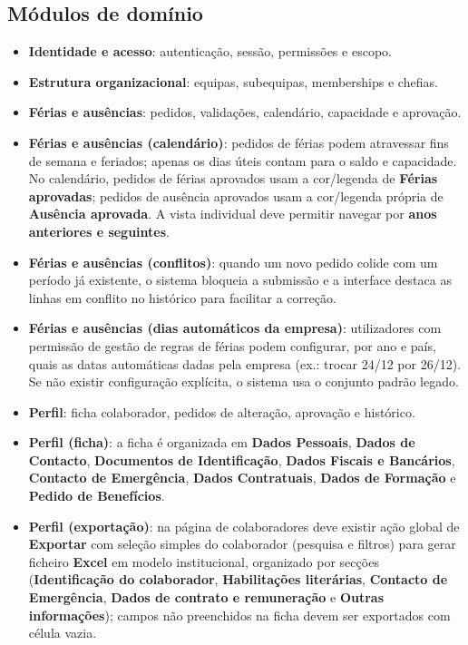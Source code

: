 \documentclass[11pt,a4paper]{article}
\begin{document}
\subsection{Módulos de domínio}
\begin{itemize}
  \item \textbf{Identidade e acesso}: autenticação, sessão, permissões e escopo.
  \item \textbf{Estrutura organizacional}: equipas, subequipas, memberships e chefias.
  \item \textbf{Férias e ausências}: pedidos, validações, calendário, capacidade e aprovação.
  \item \textbf{Férias e ausências (calendário)}: pedidos de férias podem atravessar fins de semana e feriados; apenas os dias úteis contam para o saldo e capacidade. No calendário, pedidos de férias aprovados usam a cor/legenda de \textbf{Férias aprovadas}; pedidos de ausência aprovados usam a cor/legenda própria de \textbf{Ausência aprovada}. A vista individual deve permitir navegar por \textbf{anos anteriores e seguintes}.
  \item \textbf{Férias e ausências (conflitos)}: quando um novo pedido colide com um período já existente, o sistema bloqueia a submissão e a interface destaca as linhas em conflito no histórico para facilitar a correção.
  \item \textbf{Férias e ausências (dias automáticos da empresa)}: utilizadores com permissão de gestão de regras de férias podem configurar, por ano e país, quais as datas automáticas dadas pela empresa (ex.: trocar 24/12 por 26/12). Se não existir configuração explícita, o sistema usa o conjunto padrão legado.
  \item \textbf{Perfil}: ficha colaborador, pedidos de alteração, aprovação e histórico.
  \item \textbf{Perfil (ficha)}: a ficha é organizada em \textbf{Dados Pessoais}, \textbf{Dados de Contacto}, \textbf{Documentos de Identificação}, \textbf{Dados Fiscais e Bancários}, \textbf{Contacto de Emergência}, \textbf{Dados Contratuais}, \textbf{Dados de Formação} e \textbf{Pedido de Benefícios}.
  \item \textbf{Perfil (exportação)}: na página de colaboradores deve existir ação global de \textbf{Exportar} com seleção simples do colaborador (pesquisa e filtros) para gerar ficheiro \textbf{Excel} em modelo institucional, organizado por secções (\textbf{Identificação do colaborador}, \textbf{Habilitações literárias}, \textbf{Contacto de Emergência}, \textbf{Dados de contrato e remuneração} e \textbf{Outras informações}); campos não preenchidos na ficha devem ser exportados com célula vazia.

\end{itemize}
\end{document}
